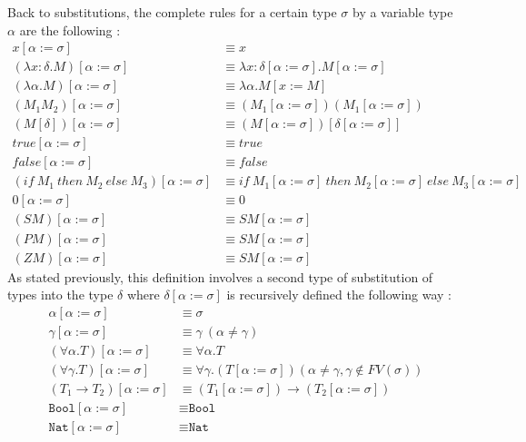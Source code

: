\documentclass{article}
\begin{document}
    Back to substitutions, the complete rules for a certain type $\sigma$ by a variable type $\alpha$ are the following :
    \label{substitution2}\begin{align*}
            x[\alpha:=\sigma] &\equiv x\\
            (\lambda x : \delta .M)[\alpha:=\sigma] &\equiv \lambda x : \delta [\alpha:=\sigma] .M[\alpha:=\sigma] \\
            (\lambda \alpha .M)[\alpha:=\sigma] &\equiv \lambda \alpha .M[x:=M]\\
            (M_1 M_2)[\alpha:=\sigma] &\equiv (M_1[\alpha:=\sigma])(M_1[\alpha:=\sigma])\\
            (M [\delta])[\alpha:=\sigma] &\equiv (M[\alpha:=\sigma])[\delta[\alpha:=\sigma]]\\
            true[\alpha:=\sigma] &\equiv true\\
            false[\alpha:=\sigma] &\equiv false\\
            (if \ M_1 \ then \ M_2 \ else \ M_3)[\alpha:=\sigma] &\equiv if \ M_1[\alpha:=\sigma] \ then \ M_2[\alpha:=\sigma] \ else \ M_3[\alpha:=\sigma]\\
            0[\alpha:=\sigma] &\equiv 0\\
            (S M)[\alpha:=\sigma] &\equiv S M[\alpha:=\sigma]\\
            (P M)[\alpha:=\sigma] &\equiv S M[\alpha:=\sigma]\\
            (Z M)[\alpha:=\sigma] &\equiv S M[\alpha:=\sigma]
        \end{align*}
    As stated previously, this definition involves a second type of substitution of types into the type $\delta$ where $\delta[\alpha:=\sigma]$ is recursively defined the following way :
    \label{substitution3}\begin{align*}
            \alpha[\alpha:=\sigma] &\equiv \sigma\\
            \gamma[\alpha:=\sigma] &\equiv \gamma \ ( \alpha\neq \gamma)\\
            (\forall \alpha .T)[\alpha:=\sigma] &\equiv \forall \alpha .T \\
            (\forall \gamma .T)[\alpha:=\sigma] &\equiv \forall \gamma .(T[\alpha:=\sigma])  (\alpha \neq \gamma,\gamma \not\in FV(\sigma)) \\
            (T_1 \rightarrow T_2)[\alpha:=\sigma] &\equiv (T_1[\alpha:=\sigma]) \rightarrow (T_2[\alpha:=\sigma])\\
            \texttt{Bool}[\alpha:=\sigma] &\equiv \texttt{Bool}\\
            \texttt{Nat}[\alpha:=\sigma] &\equiv \texttt{Nat}
        \end{align*}
\end{document}
